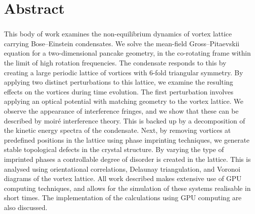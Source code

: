 \chapter*{Abstract}
\subsection*{\thesistitle}

This body of work examines the non-equilibrium dynamics of vortex lattice carrying Bose--Einstein condensates. We solve the mean-field Gross--Pitaevskii equation for a two-dimensional pancake geometry, in the co-rotating frame within the limit of high rotation frequencies. The condensate responds to this by creating a large periodic lattice of vortices with 6-fold triangular symmetry. By applying two distinct perturbations to this lattice, we examine the resulting effects on the vortices during time evolution. The first perturbation involves applying an optical potential with matching geometry to the vortex lattice. We observe the appearance of interference fringes, and we show that these can be described by moir\'e interference theory. This is backed up by a decomposition of the kinetic energy spectra of the condensate. Next, by removing vortices at predefined positions in the lattice using phase imprinting techniques, we generate stable topological defects in the crystal structure. By varying the type of imprinted phases a controllable degree of disorder is created in the lattice. This is analysed using orientational correlations, Delaunay triangulation, and Voronoi diagrams of the vortex lattice. All work described makes extensive use of GPU computing techniques, and allows for the simulation of these systems realisable in short times. The implementation of the calculations using GPU computing are also discussed.
